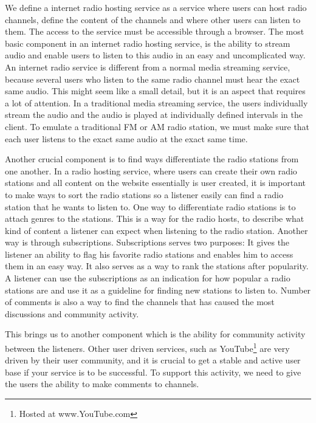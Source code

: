 \documentclass[a4paper,11pt,report]{article}
\begin{document}
{We define a internet radio hosting service as a service where users can host radio channels, define the content of the channels and where other users can listen to them. The access to the service must be accessible through a browser. The most basic component in an internet radio hosting service, is the ability to stream audio and enable users to listen to this audio in an easy and uncomplicated way. An internet radio service is different from a normal media streaming service, because several users who listen to the same radio channel must hear the exact same audio. This might seem like a small detail, but it is an aspect that requires a lot of attention. In a traditional media streaming service, the users individually stream the audio and the audio is played at individually defined intervals in the client. To emulate a traditional FM or AM radio station, we must make sure that each user listens to the exact same audio at the exact same time. 

Another crucial component is to find ways differentiate the radio stations from one another. In a radio hosting service, where users can create their own radio stations and all content on the website essentially is user created, it is important to make ways to sort the radio stations so a listener easily can find a radio station that he wants to listen to. One way to differentiate radio stations is to attach genres to the stations. This is a way for the radio hosts, to describe what kind of content a listener can expect when listening to the radio station. Another way is through subscriptions. Subscriptions serves two purposes: It gives the listener an ability to flag his favorite radio stations and enables him to access them in an easy way. It also serves as a way to rank the stations after popularity. A listener can use the subscriptions as an indication for how popular a radio stations are and use it as a guideline for finding new stations to listen to. Number of comments is also a way to find the channels that has caused the most discussions and community activity. 

This brings us to another component which is the ability for community activity between the listeners. Other user driven services, such as YouTube\footnote{Hosted at www.YouTube.com} are very driven by their user community, and it is crucial to get a stable and active user base if your service is to be successful. To support this activity, we need to give the users the ability to make comments to channels.

}
\end{document}
